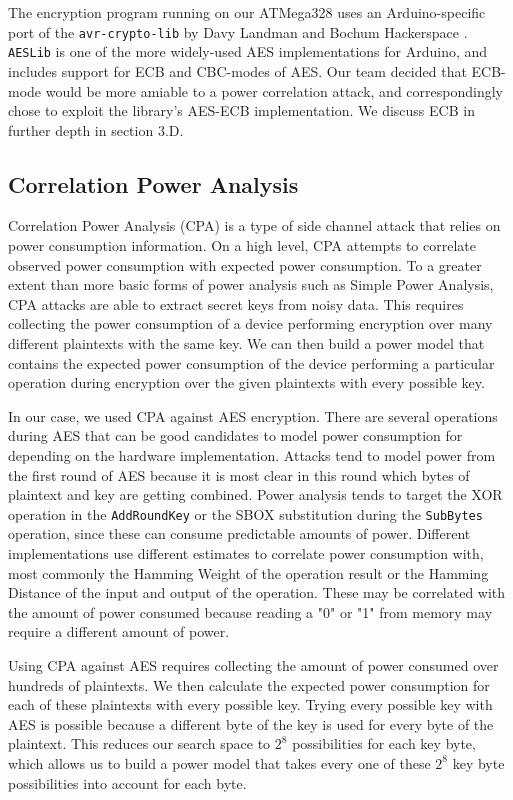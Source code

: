 \documentclass[journal]{ieee_style}
\begin{document}
The encryption program running on our ATMega328 uses an Arduino-specific port of the \texttt{avr-crypto-lib} by Davy Landman and Bochum Hackerspace \cite{AESLib} \cite{daslabor}. \texttt{AESLib} is one of the more widely-used AES implementations for Arduino, and includes support for ECB and CBC-modes of AES. Our team decided that ECB-mode would be more amiable to a power correlation attack, and correspondingly chose to exploit the library's AES-ECB implementation. We discuss ECB in further depth in section 3.D.

\subsection{Correlation Power Analysis}
Correlation Power Analysis (CPA) is a type of side channel attack that relies on power consumption information. On a high level, CPA attempts to correlate observed power consumption with expected power consumption. To a greater extent than more basic forms of power analysis such as Simple Power Analysis, CPA attacks are able to extract secret keys from noisy data. This requires collecting the power consumption of a device performing encryption over many different plaintexts with the same key. We can then build a power model that contains the expected power consumption of the device performing a particular operation during encryption over the given plaintexts with every possible key. 

In our case, we used CPA against AES encryption. There are several operations during AES that can be good candidates to model power consumption for depending on the hardware implementation. Attacks tend to model power from the first round of AES because it is most clear in this round which bytes of plaintext and key are getting combined. Power analysis tends to target the XOR operation in the \texttt{AddRoundKey} or the SBOX substitution during the \texttt{SubBytes} operation, since these can consume predictable amounts of power. Different implementations use different estimates to correlate power consumption with, most commonly the Hamming Weight of the operation result or the Hamming Distance of the input and output of the operation. These may be correlated with the amount of power consumed because reading a "0" or "1" from memory may require a different amount of power.
 
Using CPA against AES requires collecting the amount of power consumed over hundreds of plaintexts. We then calculate the expected power consumption for each of these plaintexts with every possible key. Trying every possible key with AES is possible because a different byte of the key is used for every byte of the plaintext. This reduces our search space to $2^8$ possibilities for each key byte, which allows us to build a power model that takes every one of these $2^8$ key byte possibilities into account for each byte. 
\end{document}
